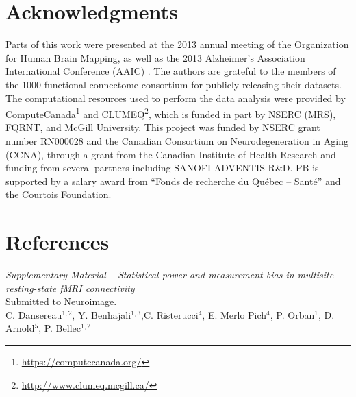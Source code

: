 \documentclass[authoryear]{elsarticle}
\begin{document}
\section{Acknowledgments}
Parts of this work were presented at the 2013 annual meeting of the Organization for Human Brain Mapping, as well as the 2013 Alzheimer's Association International Conference (AAIC) \citep{Dansereau2013b}. The authors are grateful to the members of the 1000 functional connectome consortium for publicly releasing their datasets. The computational resources used to perform the data analysis were provided by ComputeCanada\footnote{\url{https://computecanada.org/}} and CLUMEQ\footnote{\url{http://www.clumeq.mcgill.ca/}}, which is funded in part by NSERC (MRS), FQRNT, and McGill University. This project was funded by NSERC grant number RN000028 and the Canadian
Consortium on Neurodegeneration in Aging (CCNA), through a grant from
the Canadian Institute of Health Research and funding from several partners including SANOFI-ADVENTIS R\&D. PB is supported by a salary award from ``Fonds de recherche du Qu\'ebec -- Sant\'e'' and the Courtois Foundation.

\section*{References}





\pagebreak



\clearpage
\appendix


\clearpage
\pagebreak
\renewcommand{\thefigure}{S\arabic{figure}}
\renewcommand{\thetable}{S\arabic{table}}
\setcounter{figure}{0}
\begin{center}
\emph{Supplementary Material {--} Statistical power and measurement bias in multisite resting-state fMRI connectivity}\\

\vspace{\baselineskip}Submitted to Neuroimage.\\

\vspace{\baselineskip}C. Dansereau$^{1,2}$,  Y. Benhajali$^{1,3}$,C. Risterucci$^{4}$, E. Merlo Pich$^{4}$, P. Orban$^{1}$, D. Arnold$^{5}$, P. Bellec$^{1,2}$\\

\end{center}
\end{document}
